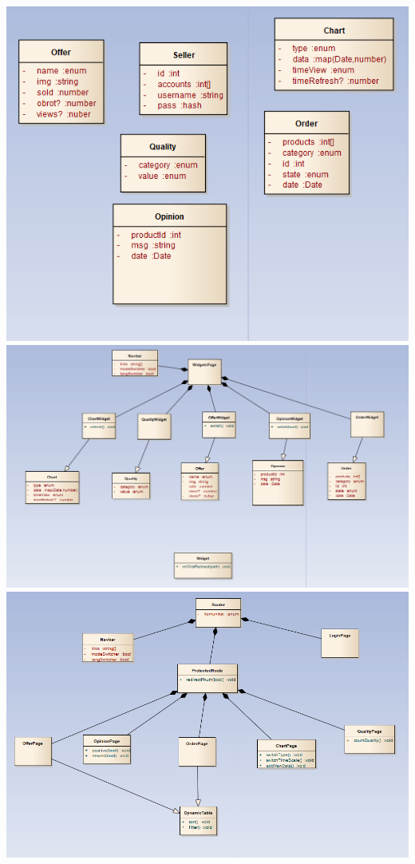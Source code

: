 \documentclass[a4paper,11pt]{article}
\begin{document}
\includegraphics[scale=0.5]{src/u5.png}\\
\includegraphics[scale=0.5]{src/u6.png}\\
\includegraphics[scale=0.5]{src/u7.png}\\
\end{document}

